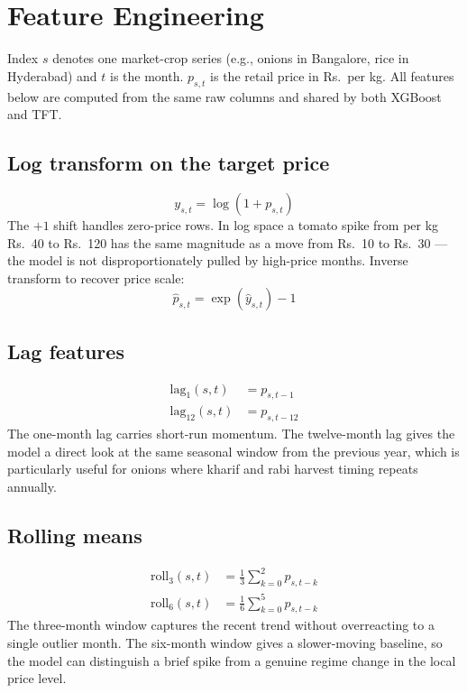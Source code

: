 \documentclass[conference,twoside]{IEEEtran}
\begin{document}
\section{Feature Engineering}
\label{sec:preprocessing}

Index $s$ denotes one market-crop series (e.g., onions in Bangalore, rice in Hyderabad) and $t$ is the month. $p_{s,t}$ is the retail price in Rs.\ per kg. All features below are computed from the same raw columns and shared by both XGBoost and TFT.

\subsection{Log transform on the target price}
\begin{equation}
y_{s,t} = \log(1 + p_{s,t})
\label{eq:logtransform}
\end{equation}
The $+1$ shift handles zero-price rows. In log space a tomato spike from per kg Rs.\ 40 to Rs.\ 120 has the same magnitude as a move from Rs.\ 10 to Rs.\ 30 --- the model is not disproportionately pulled by high-price months. Inverse transform to recover price scale:
\begin{equation}
\hat{p}_{s,t} = \exp(\hat{y}_{s,t}) - 1
\label{eq:invlog}
\end{equation}

\subsection{Lag features}
\begin{align}
\text{lag}_{1}(s,t)  &= p_{s,t-1} \label{eq:lag1}\\
\text{lag}_{12}(s,t) &= p_{s,t-12} \label{eq:lag12}
\end{align}
The one-month lag carries short-run momentum. The twelve-month lag gives the model a direct look at the same seasonal window from the previous year, which is particularly useful for onions where kharif and rabi harvest timing repeats annually.

\subsection{Rolling means}
\begin{align}
\text{roll}_{3}(s,t) &= \tfrac{1}{3}\textstyle\sum_{k=0}^{2} p_{s,t-k} \label{eq:roll3}\\
\text{roll}_{6}(s,t) &= \tfrac{1}{6}\textstyle\sum_{k=0}^{5} p_{s,t-k} \label{eq:roll6}
\end{align}
The three-month window captures the recent trend without overreacting to a single outlier month. The six-month window gives a slower-moving baseline, so the model can distinguish a brief spike from a genuine regime change in the local price level.
\end{document}
